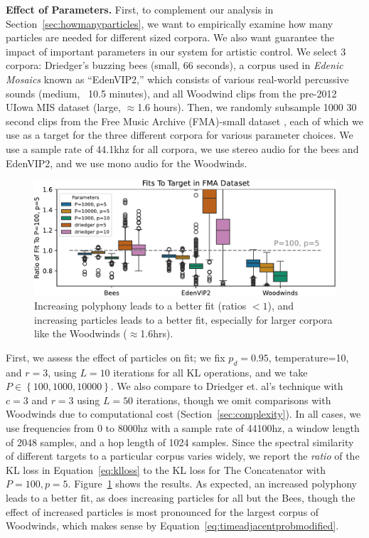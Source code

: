 \documentclass{article}
\begin{document}
\textbf{Effect of Parameters.} First, to complement our analysis in Section~\ref{sec:howmanyparticles}, we want to empirically examine how many particles are needed for different sized corpora.  We also want guarantee the impact of important parameters in our system for artistic control.  We select 3 corpora: Driedger's buzzing bees (small, 66 seconds), a corpus used in {\em Edenic Mosaics}\cite{cantil2021} known as ``EdenVIP2,'' which consists of various real-world percussive sounds (medium, ~10.5 minutes), and all Woodwind clips from the pre-2012 UIowa MIS dataset \cite{uiowadataset} (large, $\approx$1.6 hours).  Then, we randomly subsample 1000 30 second clips from the Free Music Archive (FMA)-small dataset \cite{fma_dataset}, each of which we use as a target for the three different corpora for various parameter choices.  We use a sample rate of 44.1khz for all corpora, we use stereo audio for the bees and EdenVIP2, and we use mono audio for the Woodwinds.

\begin{figure}
    \centering
    \includegraphics[width=\columnwidth]{figs/FMAFit.pdf}
    \caption{Increasing polyphony leads to a better fit (ratios $<1$), and increasing particles leads to a better fit, especially for larger corpora like the Woodwinds ($\approx$1.6hrs).}
    \label{fig:fmafit}
\end{figure}

First, we assess the effect of particles on fit; we fix $p_d=0.95$, temperature=10, and $r=3$, using $L=10$ iterations for all KL operations, and we take $P \in \left\{ 100, 1000, 10000 \right\}$.  We also compare to Driedger et. al's technique with $c=3$ and $r=3$ using $L=50$ iterations, though we omit comparisons with Woodwinds due to computational cost (Section~\ref{sec:complexity}).  In all cases, we use frequencies from $0$ to $8000$hz with a sample rate of 44100hz, a window length of 2048 samples, and a hop length of 1024 samples.  Since the spectral similarity of different targets to a particular corpus varies widely, we report the {\em ratio} of the KL loss in Equation~\ref{eq:klloss} to the KL loss for The Concatenator with $P=100, p=5$.  Figure~\ref{fig:fmafit} shows the results.  As expected, an increased polyphony leads to a better fit, as does increasing particles for all but the Bees, though the effect of increased particles is most pronounced for the largest corpus of Woodwinds, which makes sense by Equation~\ref{eq:timeadjacentprobmodified}.
\end{document}
